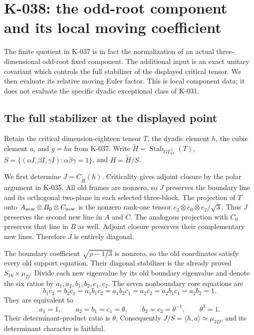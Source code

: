 \section{K-038: the odd-root component and its local moving coefficient}

The finite quotient in K-037 is in fact the normalization of an
actual three-dimensional odd-root fixed component. The additional
input is an exact unitary covariant which controls the full
stabilizer of the displayed critical tensor. We then evaluate its
relative moving Euler factor. This is local component data; it
does not evaluate the specific dyadic exceptional class of K-031.

\subsection*{The full stabilizer at the displayed point}

Retain the critical dimension-eighteen tensor $T$, the dyadic
element $h$, the cubic element $a$, and $g=ha$ from K-037.
Write $\widetilde H=\operatorname{Stab}_{GL_{18}^3}(T)$,
$S=\{(\alpha I,\beta I,\gamma I):\alpha\beta\gamma=1\}$,
and $H=\widetilde H/S$.

We first determine $J=C_{\widetilde H}(h)$.
Criticality gives adjoint closure by the polar argument in K-035.
All old frames are nonzero, so $J$ preserves the boundary line
and its orthogonal two-plane in each selected three-block.
The projection of $T$ onto
$A_{\rm new}\otimes B_0\otimes C_{\rm new}$ is the nonzero
rank-one tensor $e_2\otimes e_0\otimes e_2/\sqrt3$.
Thus $J$ preserves the second new line in $A$ and $C$.
The analogous projection with $C_0$ preserves that line in
$B$ as well. Adjoint closure preserves their complementary
new lines. Therefore $J$ is entirely diagonal.

The boundary coefficient $\sqrt{\rho-1/3}$ is nonzero,
so the old coordinates satisfy every old support equation.
Their diagonal stabilizer is the already proved
$S_{16}\times\mu_D$. Divide each new eigenvalue by its old
boundary eigenvalue and denote the six ratios by
$a_1,a_2,b_1,b_2,c_1,c_2$. The seven nonboundary core equations
are
\[
 b_1c_2=b_2c_1=a_1b_1c_2=a_1b_2c_1
          =a_2c_2=a_2b_1c_1=a_2b_2=1.
\]
They are equivalent to
\[
 a_1=1,\qquad a_2=b_1=c_1=\theta,\qquad
 b_2=c_2=\theta^{-1},\qquad\theta^3=1.                    \tag{K-038a}
\]
Their determinant-product ratio is $\theta$.
Consequently $J/S=\langle h,a\rangle\simeq\mu_{3D}$,
and its determinant character is faithful.

